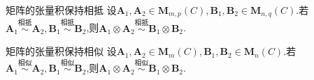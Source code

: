 \begin{corollary}{矩阵的张量积保持相抵}{}
	设$\boldsymbol{A}_{1},\boldsymbol{A}_{2}\in\mathbf{M}_{m,p}\left(C\right),\boldsymbol{B}_{1},\boldsymbol{B}_{2}\in\mathbf{M}_{n,q}\left(C\right)$.若$\boldsymbol{A}_{1}\overset{\text{相抵}}{\sim}\boldsymbol{A}_{2},\boldsymbol{B}_{1}\overset{\text{相抵}}{\sim}\boldsymbol{B}_{2}$,则$\boldsymbol{A}_{1}\otimes\boldsymbol{A}_{2}\overset{\text{相抵}}{\sim}\boldsymbol{B}_{1}\otimes\boldsymbol{B}_{2}$.
\end{corollary}

\begin{corollary}{矩阵的张量积保持相似}{}
	设$\boldsymbol{A}_{1},\boldsymbol{A}_{2}\in\mathbf{M}_{m}\left(C\right),\boldsymbol{B}_{1},\boldsymbol{B}_{2}\in\mathbf{M}_{n}\left(C\right)$.若$\boldsymbol{A}_{1}\overset{\text{相似}}{\sim}\boldsymbol{A}_{2},\boldsymbol{B}_{1}\overset{\text{相似}}{\sim}\boldsymbol{B}_{2}$,则$\boldsymbol{A}_{1}\otimes\boldsymbol{A}_{2}\overset{\text{相似}}{\sim}\boldsymbol{B}_{1}\otimes\boldsymbol{B}_{2}$.
\end{corollary}